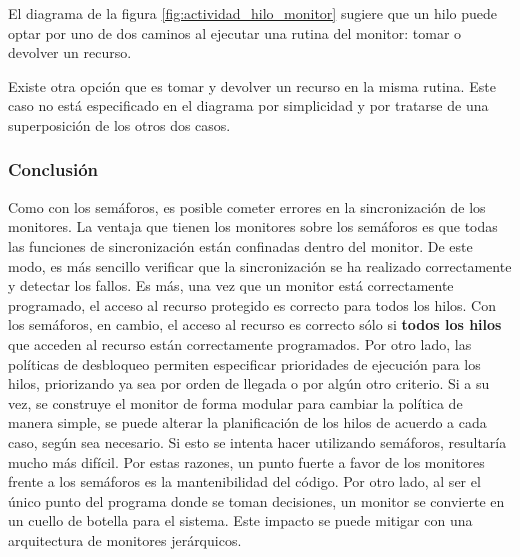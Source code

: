 El diagrama de la figura \ref{fig:actividad_hilo_monitor} sugiere que un
hilo puede optar por uno de dos caminos al ejecutar una rutina del monitor:
tomar o devolver un recurso.

Existe otra opción que es tomar y devolver un recurso en la misma rutina. Este
caso no está especificado en el diagrama por simplicidad y por tratarse de una
superposición de los otros dos casos.

\subsubsection{Conclusión}
Como con los semáforos, es posible cometer errores en la sincronización de los
monitores. La ventaja que tienen los monitores sobre los semáforos es que todas
las funciones de sincronización están confinadas dentro del monitor. De este
modo, es más sencillo verificar que la sincronización se ha realizado
correctamente y detectar los fallos. Es más, una vez que un monitor está
correctamente programado, el acceso al recurso protegido es correcto para todos
los hilos. Con los semáforos, en cambio, el acceso al recurso es correcto
sólo si \textbf{todos los hilos} que acceden al recurso están correctamente
programados.\cite{SistOpStallings} Por otro lado, las políticas de desbloqueo
permiten especificar prioridades de ejecución para los hilos, priorizando ya
sea por orden de llegada o por algún otro criterio. Si a su vez, se construye
el monitor de forma modular para cambiar la política de manera simple, se puede
alterar la planificación de los hilos de acuerdo a cada caso, según sea
necesario. Si esto se intenta hacer utilizando semáforos, resultaría mucho más
difícil.
Por estas razones, un punto fuerte a favor de los monitores frente a los semáforos es la mantenibilidad del código.
Por otro lado, al ser el único punto del programa donde se toman decisiones, un monitor se convierte en un cuello de botella para el sistema. Este impacto se puede mitigar con una arquitectura de monitores jerárquicos.
